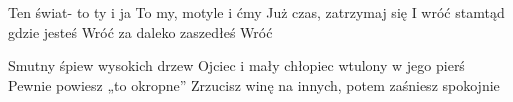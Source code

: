 \documentclass[../../../songbook.tex]{subfiles}
\begin{document}
\-\hspace{1cm} Ten świat- to ty i ja	 \newline		
\-\hspace{1cm} To my, motyle i ćmy		 \newline	
\-\hspace{1cm} Już czas, zatrzymaj się		 \newline	
\-\hspace{1cm} I wróć stamtąd gdzie jesteś	 \newline	
\-\hspace{1cm} Wróć za daleko zaszedłeś 	 \newline	
\-\hspace{1cm} Wróć					

Smutny śpiew wysokich drzew \newline
Ojciec i mały chłopiec wtulony w jego pierś \newline
Pewnie powiesz „to okropne” \newline
Zrzucisz winę na innych, potem zaśniesz spokojnie \newline
\end{document}
